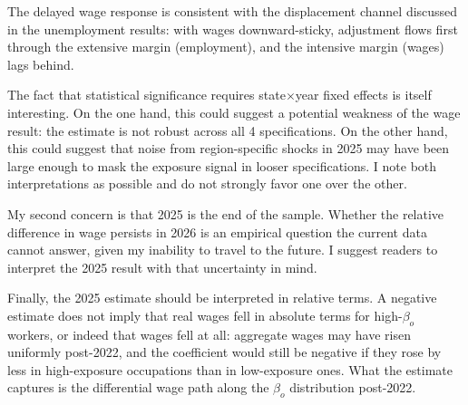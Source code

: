 \documentclass[11pt]{article}
\begin{document}
The delayed wage response is consistent with the displacement channel discussed in the unemployment results: with wages downward-sticky, adjustment flows first through the extensive margin (employment), and the intensive margin (wages) lags behind.

The fact that statistical significance requires state$\times$year fixed effects is itself interesting.  On the one hand, this could suggest a potential weakness of the wage result: the estimate is not robust across all 4 specifications.  On the other hand, this could suggest that noise from region-specific shocks in 2025 may have been large enough to mask the exposure signal in looser specifications.  I note both interpretations as possible and do not strongly favor one over the other.

My second concern is that 2025 is the end of the sample.  Whether the relative difference in wage persists in 2026 is an empirical question the current data cannot answer, given my inability to travel to the future.  I suggest readers to interpret the 2025 result with that uncertainty in mind.

Finally, the 2025 estimate should be interpreted in relative terms.  A negative estimate does not imply that real wages fell in absolute terms for high-$\beta_o$ workers, or indeed that wages fell at all: aggregate wages may have risen uniformly post-2022, and the coefficient would still be negative if they rose by less in high-exposure occupations than in low-exposure ones.  What the estimate captures is the differential wage path along the $\beta_o$ distribution post-2022.

\printbibliography
\end{document}
